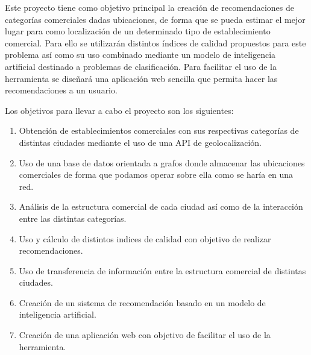 

Este proyecto tiene como objetivo principal la creación de recomendaciones de categorías comerciales dadas ubicaciones, de forma que se pueda estimar el mejor lugar para como localización de un determinado tipo de establecimiento comercial. Para ello se utilizarán distintos índices de calidad propuestos para este problema así como su uso combinado mediante un modelo de inteligencia artificial destinado a problemas de clasificación. Para facilitar el uso de la herramienta se diseñará una aplicación web sencilla que permita hacer las recomendaciones a un usuario.

Los objetivos para llevar a cabo el proyecto son los siguientes:

\begin{enumerate}
	\item Obtención de establecimientos comerciales con sus respectivas categorías de distintas ciudades mediante el uso de una API de geolocalización.
	\item Uso de una base de datos orientada a grafos donde almacenar las ubicaciones comerciales de forma que podamos operar sobre ella como se haría en una red.
	\item Análisis de la estructura comercial de cada ciudad así como de la interacción entre las distintas categorías.
	\item Uso y cálculo de distintos indices de calidad con objetivo de realizar recomendaciones.
	\item Uso de transferencia de información entre la estructura comercial de distintas ciudades.
	\item Creación de un sistema de recomendación basado en un modelo de inteligencia artificial.
	\item Creación de una aplicación web con objetivo de facilitar el uso de la herramienta.
\end{enumerate}

